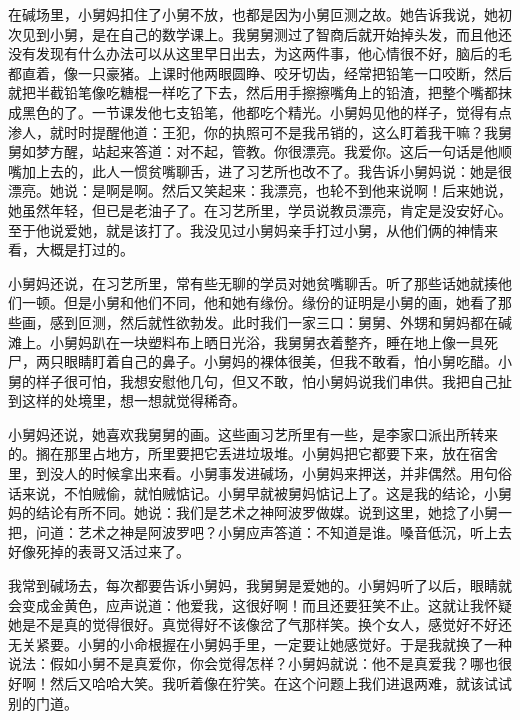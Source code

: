 在碱场里，小舅妈扣住了小舅不放，也都是因为小舅叵测之故。她告诉我说，她初次见到小舅，是在自己的数学课上。我舅舅测过了智商后就开始掉头发，而且他还没有发现有什么办法可以从这里早日出去，为这两件事，他心情很不好，脑后的毛都直着，像一只豪猪。上课时他两眼圆睁、咬牙切齿，经常把铅笔一口咬断，然后就把半截铅笔像吃糖棍一样吃了下去，然后用手擦擦嘴角上的铅渣，把整个嘴都抹成黑色的了。一节课发他七支铅笔，他都吃个精光。小舅妈见他的样子，觉得有点渗人，就时时提醒他道：王犯，你的执照可不是我吊销的，这么盯着我干嘛？我舅舅如梦方醒，站起来答道：对不起，管教。你很漂亮。我爱你。这后一句话是他顺嘴加上去的，此人一惯贫嘴聊舌，进了习艺所也改不了。我告诉小舅妈说：她是很漂亮。她说：是啊是啊。然后又笑起来：我漂亮，也轮不到他来说啊！后来她说，她虽然年轻，但已是老油子了。在习艺所里，学员说教员漂亮，肯定是没安好心。至于他说爱她，就是该打了。我没见过小舅妈亲手打过小舅，从他们俩的神情来看，大概是打过的。 

小舅妈还说，在习艺所里，常有些无聊的学员对她贫嘴聊舌。听了那些话她就揍他们一顿。但是小舅和他们不同，他和她有缘份。缘份的证明是小舅的画，她看了那些画，感到叵测，然后就性欲勃发。此时我们一家三口：舅舅、外甥和舅妈都在碱滩上。小舅妈趴在一块塑料布上晒日光浴，我舅舅衣着整齐，睡在地上像一具死尸，两只眼睛盯着自己的鼻子。小舅妈的裸体很美，但我不敢看，怕小舅吃醋。小舅的样子很可怕，我想安慰他几句，但又不敢，怕小舅妈说我们串供。我把自己扯到这样的处境里，想一想就觉得稀奇。 

小舅妈还说，她喜欢我舅舅的画。这些画习艺所里有一些，是李家口派出所转来的。搁在那里占地方，所里要把它丢进垃圾堆。小舅妈把它都要下来，放在宿舍里，到没人的时候拿出来看。小舅事发进碱场，小舅妈来押送，并非偶然。用句俗话来说，不怕贼偷，就怕贼惦记。小舅早就被舅妈惦记上了。这是我的结论，小舅妈的结论有所不同。她说：我们是艺术之神阿波罗做媒。说到这里，她捻了小舅一把，问道：艺术之神是阿波罗吧？小舅应声答道：不知道是谁。嗓音低沉，听上去好像死掉的表哥又活过来了。 

我常到碱场去，每次都要告诉小舅妈，我舅舅是爱她的。小舅妈听了以后，眼睛就会变成金黄色，应声说道：他爱我，这很好啊！而且还要狂笑不止。这就让我怀疑她是不是真的觉得很好。真觉得好不该像岔了气那样笑。换个女人，感觉好不好还无关紧要。小舅的小命根握在小舅妈手里，一定要让她感觉好。于是我就换了一种说法：假如小舅不是真爱你，你会觉得怎样？小舅妈就说：他不是真爱我？哪也很好啊！然后又哈哈大笑。我听着像在狞笑。在这个问题上我们进退两难，就该试试别的门道。 

